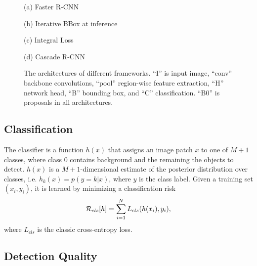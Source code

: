 \documentclass[10pt,twocolumn,letterpaper]{article}
\begin{document}
\begin{figure*}[!t]
\begin{minipage}[b]{.17\linewidth}
\centering
\centerline{}{(a) Faster R-CNN}
\end{minipage}
\hfill
\begin{minipage}[b]{.3\linewidth}
\centering
\centerline{}{(b) Iterative BBox at inference}
\end{minipage}
\hfill
\begin{minipage}[b]{.21\linewidth}
\centering
\centerline{}{(c) Integral Loss}
\end{minipage}
\hfill
\begin{minipage}[b]{.3\linewidth}
\centering
\centerline{}{(d) Cascade R-CNN}
\end{minipage}
\caption{The architectures of different frameworks. ``I'' is input image, ``conv'' backbone convolutions, ``pool'' region-wise feature extraction, ``H'' network head, ``B'' bounding box, and ``C'' classification. ``B0'' is proposals in all architectures.}
\label{fig:framework}
\end{figure*}

\subsection{Classification}
\label{subsec:classification}

The classifier is a function $h(x)$ that assigns an image patch $x$ to one
of $M+1$ classes, where class $0$ contains background and the remaining
the objects to detect. $h(x)$ is a $M+1$-dimensional estimate
of the posterior distribution over classes, i.e. $h_k(x)=p(y=k|x)$,
where $y$ is the class label. Given a training set $(x_i, y_i)$, it is
learned by minimizing a classification risk
\begin{equation}
  {\cal R}_{cls}[h] = \sum_{i=1}^{N}L_{cls}(h(x_i),y_i),
  \label{eq:clsrisk}
\end{equation}
where $L_{cls}$ is the classic cross-entropy loss.


\subsection{Detection Quality}
\end{document}
